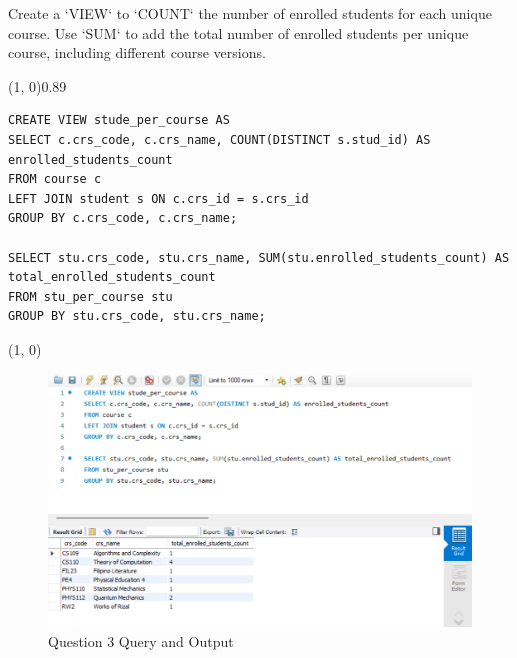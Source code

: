 
Create a `VIEW` to `COUNT` the number of enrolled students for each unique course. Use `SUM` to add the total number of enrolled students per unique course, including different course versions.
\vspace{\baselineskip}

\sol{}
\noindent\line(1, 0){0.89\linewidth}
\begin{verbatim}
CREATE VIEW stude_per_course AS
SELECT c.crs_code, c.crs_name, COUNT(DISTINCT s.stud_id) AS enrolled_students_count
FROM course c
LEFT JOIN student s ON c.crs_id = s.crs_id
GROUP BY c.crs_code, c.crs_name;

SELECT stu.crs_code, stu.crs_name, SUM(stu.enrolled_students_count) AS total_enrolled_students_count
FROM stu_per_course stu
GROUP BY stu.crs_code, stu.crs_name;
\end{verbatim}
\noindent\line(1, 0){\linewidth}

\begin{figure}[H]
    \centering
    \includegraphics[width=0.7\linewidth]{images/q3.png}
    \caption{Question 3 Query and Output}
\end{figure}
